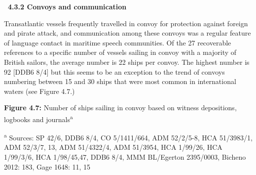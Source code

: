 \begin{styleStandard}
\textbf{\ 4.3.2 Convoys and communication}
\end{styleStandard}

\begin{styleStandard}
Transatlantic vessels frequently travelled in convoy for protection against foreign and pirate attack, and communication among these convoys was a regular feature of language contact in maritime speech communities. Of the 27 recoverable references to a specific number of vessels sailing in convoy with a majority of British sailors, the average number is 22 ships per convoy. The highest number is 92 [DDB6 8/4] but this seems to be an exception to the trend of convoys numbering between 15 and 30 ships that were most common in international waters (see Figure 4.7.) 
\end{styleStandard}

\begin{styleStandard}
  [Warning: Image ignored] %
 
\end{styleStandard}

\begin{styleStandard}
\textbf{Figure 4.7:} Number of ships sailing in convoy based on witness depositions, logbooks and journals\textsuperscript{a}
\end{styleStandard}

\begin{styleStandard}
\textsuperscript{a }Sources: SP 42/6, DDB6 8/4, CO 5/1411/664, ADM 52/2/5-8, HCA 51/3983/1, ADM 52/3/7, 13, ADM 51/4322/4, ADM 51/3954, HCA 1/99/26, HCA 1/99/3/6, HCA 1/98/45,47, DDB6 8/4, MMM BL/Egerton 2395/0003, Bicheno 2012: 183, Gage 1648: 11, 15
\end{styleStandard}

